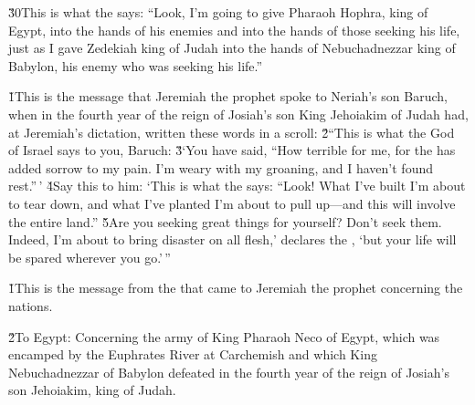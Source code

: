 \v{30}This is what the  says: ``Look, I'm going to give Pharaoh Hophra, king of Egypt, into the hands of his enemies and into the hands of those seeking his life, just as I gave Zedekiah king of Judah into the hands of Nebuchadnezzar king of Babylon, his enemy who was seeking his life.''

\v{1}This is the message that Jeremiah the prophet spoke to Neriah's son Baruch, when in the fourth year of the reign of Josiah's son King Jehoiakim of Judah had, at Jeremiah's dictation, written these words in a scroll: \v{2}``This is what the  God of Israel says to you, Baruch: \v{3}`You have said, ``How terrible for me, for the  has added sorrow to my pain. I'm weary with my groaning, and I haven't found rest.''\,' \v{4}Say this to him: `This is what the  says: ``Look! What I've built I'm about to tear down, and what I've planted I'm about to pull up---and this will involve the entire land.'' \v{5}Are you seeking great things for yourself? Don't seek them. Indeed, I'm about to bring disaster on all flesh,' declares the , `but your life will be spared wherever you go.'\,''

\v{1}This is the message from the  that came to Jeremiah the prophet concerning the nations.

\v{2}To Egypt: Concerning the army of King Pharaoh Neco of Egypt, which was encamped by the Euphrates River at Carchemish and which King Nebuchadnezzar of Babylon defeated in the fourth year of the reign of Josiah's son Jehoiakim, king of Judah.

